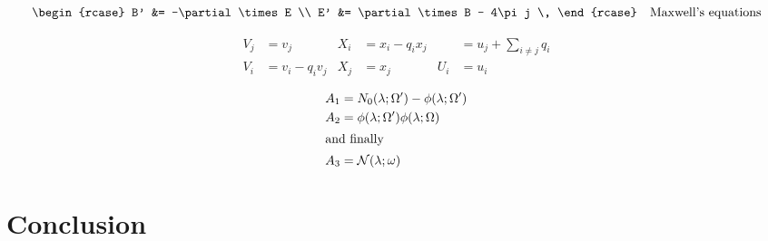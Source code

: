 \documentclass{article}
\begin{document}
\begin{CJK}{GBK}{song}
\begin{equation*}
  \begin{rcase}
    B' &= -\partial\times E          \\
    E' &=  \partial\times B - 4\pi j \,
  \end{rcase}
  \quad \text {Maxwell's equations}
\end{equation*}

\begin{equation} \begin{aligned}
  V_j &= v_j                      &
  X_i &= x_i - q_i x_j            &
      &= u_j + \sum_{i\ne j} q_i \\
  V_i &= v_i - q_i v_j            &
  X_j &= x_j                      &
  U_i &= u_i
\end{aligned} \end{equation}

\begin{align}
  A_1 &= N_0 (\lambda ; \Omega')
         -  \phi ( \lambda ; \Omega')   \\
  A_2 &= \phi (\lambda ; \Omega')
            \phi (\lambda ; \Omega)     \\
\intertext{and finally}
  A_3 &= \mathcal{N} (\lambda ; \omega)
\end{align}

\section{Conclusion}

\end{CJK}
\end{document}
